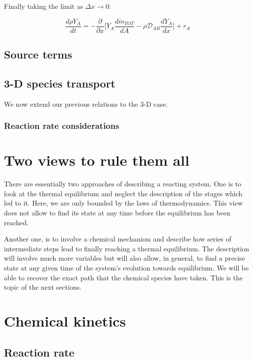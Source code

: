 \documentclass[10pt,twocolumn]{article}
\begin{document}
Finally taking the limit as $\Delta x \rightarrow 0$:

\begin{equation}
\frac{d \rho Y_{A} }{dt} = - \frac{\partial}{\partial x}\Big[ Y_A \frac{d \dot{m}_{TOT}}{d A} - \rho \mathcal{D}_{AB} \frac{dY_A}{dx} \Big] + r_A
\end{equation}






\subsection{Source terms}

\subsection{3-D species transport}

We now extend our previous relations to the 3-D case.

\subsubsection{Reaction rate considerations}

\section{Two views to rule them all}

There are essentially two approaches of describing a reacting system. One is to look at the thermal equilibrium and neglect the description of the stages which led to it. Here, we are only bounded by the laws of thermodynamics. This view does not allow to find its state at any time before the equilibrium has been reached.

Another one, is to involve a chemical mechanism and describe how series of intermediate steps lead to finally reaching a thermal equilibrium. The description will involve much more variables but will also allow, in general, to find a precise state at any given time of the system's evolution towards equilibrium. We will be able to recover the exact path that the chemical species have taken. This is the topic of the next sections.

\section{Chemical kinetics}

\subsection{Reaction rate}
\end{document}
